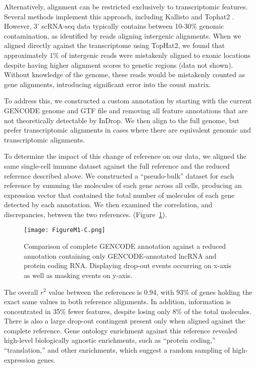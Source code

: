 Alternatively, alignment can be restricted exclusively to transcriptomic features. 
Several methods implement this approach, including Kallisto \citep{Bray2016} and Tophat2 \citep{Kim2013}. 
However, 3' scRNA-seq data typically contains between 10-30\% genomic contamination, as identified by reads aligning intergenic alignments. 
When we aligned directly against the transcriptome using TopHat2, we found that approximately 1\% of intergenic reads were mistakenly aligned to exonic locations despite having higher alignment scores to genetic regions (data not shown). 
Without knowledge of the genome, these reads would be mistakenly counted as gene alignments, introducing significant error into the count matrix. 

To address this, we constructed a custom annotation by starting with the current GENCODE genome and GTF file and removing all feature annotations that are not theoretically detectable by InDrop.
We then align to the full genome, but prefer transcriptomic alignments in cases where there are equivalent genomic and transcriptomic alignments.

To determine the impact of this change of reference on our data, we aligned the same single-cell immune dataset against the full reference and the reduced reference described above. 
We constructed a ``pseudo-bulk'' dataset for each reference by summing the molecules of each gene across all cells, producing an expression vector that contained the total number of molecules of each gene detected by each annotation. 
We then examined the correlation, and discrepancies, between the two references.
(Figure~\ref{fig:m1c}).

\begin{figure}
\centering
\texttt{[image: FigureM1-C.png]}
\caption{Comparison of complete GENCODE annotation against a reduced annotation containing only GENCODE-annotated lncRNA and protein coding RNA\@. Displaying drop-out events occurring on x-axis as well as masking events on y-axis.}
\label{fig:m1c}
\end{figure}

The overall $r^{2}$ value between the references is 0.94, with 93\% of genes holding the exact same values in both reference alignments. 
In addition, information is concentrated in 35\% fewer features, despite losing only 8\% of the total molecules. 
There is also a large drop-out contingent present only when aligned against the complete reference. 
Gene ontology enrichment against this reference revealed high-level biologically agnostic enrichments, such as ``protein coding,'' ``translation,'' and other enrichments, which suggest a random sampling of high-expression genes.

